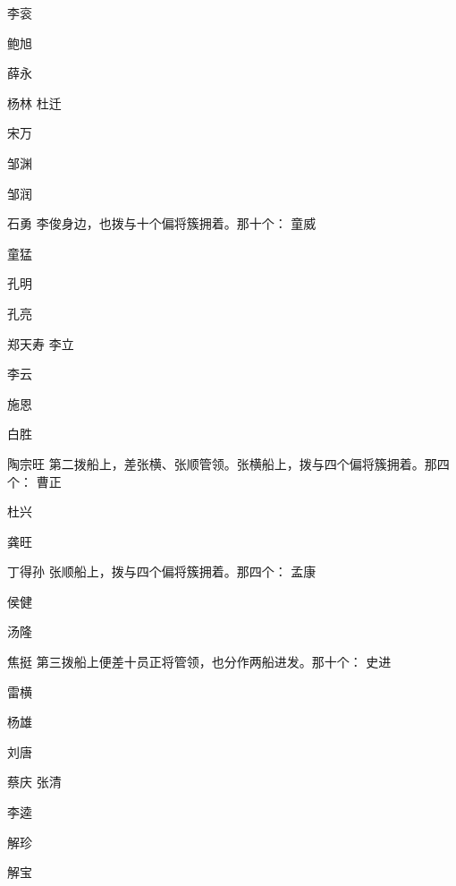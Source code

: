 李衮

鲍旭

薛永

杨林
杜迁

宋万

邹渊

邹润

石勇
李俊身边，也拨与十个偏将簇拥着。那十个：
童威

童猛

孔明

孔亮

郑天寿
李立

李云

施恩

白胜

陶宗旺
第二拨船上，差张横、张顺管领。张横船上，拨与四个偏将簇拥着。那四个：
曹正

杜兴

龚旺

丁得孙
张顺船上，拨与四个偏将簇拥着。那四个：
孟康

侯健

汤隆

焦挺
第三拨船上便差十员正将管领，也分作两船进发。那十个：
史进

雷横

杨雄

刘唐

蔡庆
张清

李逵

解珍

解宝


